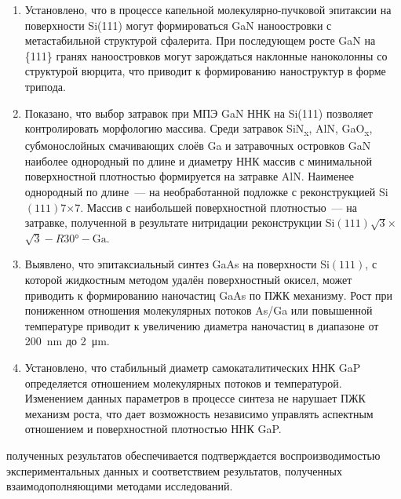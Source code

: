 {}
\begin{enumerate}[beginpenalty=10000] %
  \item	Установлено, что в процессе капельной молекулярно-пучковой эпитаксии на
    поверхности Si(111) могут формироваться GaN наноостровки с метастабильной
    структурой сфалерита. При последующем росте GaN
   на \{111\} гранях наноостровков могут зарождаться наклонные наноколонны со
   структурой вюрцита, что приводит к формированию наноструктур в форме
   трипода.
 \item Показано, что выбор затравок при МПЭ GaN ННК на Si(111) позволяет
   контролировать морфологию массива. Среди затравок SiN\textsubscript{x}, AlN,
   GaO\textsubscript{x}, субмонослойных смачивающих слоёв Ga и затравочных
   островков GaN наиболее однородный по длине и диаметру ННК массив с
   минимальной поверхностной плотностью формируется на затравке AlN. Наименее
   однородный по длине~--- на необработанной подложке с реконструкцией
   Si\((111)7\)\(\times\)\(7\). Массив с наибольшей поверхностной
   плотностью~--- на затравке, полученной в результате нитридации реконструкции
   Si\((111)\sqrt{3}\)\(\times\)\(\sqrt{3} - R30\si{\degree} - \text{Ga}\).
 \item Выявлено, что эпитаксиальный синтез GaAs на поверхности Si\((111)\), с
   которой жидкостным методом удалён поверхностный окисел, может приводить к
   формированию наночастиц GaAs по ПЖК механизму. Рост при пониженном отношения
   молекулярных потоков As/Ga или повышенной температуре приводит к увеличению
   диаметра наночастиц в диапазоне от 200~\si{\nano\metre} до
   2~\si{\micro\metre}.
 \item Установлено, что стабильный диаметр самокаталитических ННК GaP
   определяется отношением молекулярных потоков и температурой. Изменением
   данных параметров в процессе синтеза не нарушает ПЖК механизм роста, что
   дает возможность независимо управлять аспектным отношением и поверхностной
   плотностью ННК GaP.
\end{enumerate}

{\reliability} полученных результатов обеспечивается подтверждается воспроизводимостью экспериментальных данных и соответствием результатов, полученных взаимодополняющими методами исследований.

